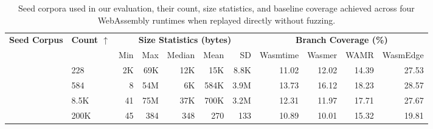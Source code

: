 \begin{table}[t]
	\centering
	\small
        \setlength{\tabcolsep}{10pt}   
        \caption{Seed corpora used in our evaluation, their count, size statistics, and baseline coverage achieved across four WebAssembly runtimes when replayed directly without fuzzing.}
	\label{tab:seed_corpora} 
	\begin{tabular}{@{}p{2cm} l r r r r r r r r r}
		\toprule
		\multirow{2}{*}{\textbf{Seed Corpus}} & 
		\multirow{2}{*}{\textbf{Count $\uparrow$}} & 
		\multicolumn{5}{c}{\textbf{Size Statistics (bytes)}} & 
		\multicolumn{4}{c}{\textbf{Branch Coverage (\%)}} \\ 
		\cmidrule(lr){3-7} \cmidrule(lr){8-11}
		                     &            & Min & Max & Median & Mean & SD & Wasmtime & Wasmer & WAMR & WasmEdge \\
		\midrule
        \llvmbench{}              & 228   & 2K  & 69K & 12K  & 15K  & 8.8K   & 11.02 & 12.02 & 14.39 & 27.53 \\
        \textbf{\tname{}}         & 584   & 8   & 54M & 6K   & 584K & 3.9M   & 13.73 & 16.12 & 18.23 & 28.57 \\
		\wasmbench{}              & 8.5K  & 41  & 75M & 37K  & 700K & 3.2M   & 12.31 & 11.97 & 17.71 & 27.67 \\
		  \specbench{}              & 200K  & 45  & 384 & 348  & 270  & 133    & 10.89 & 10.01 & 15.32 & 19.81 \\
		\bottomrule
	\end{tabular}
\end{table}

